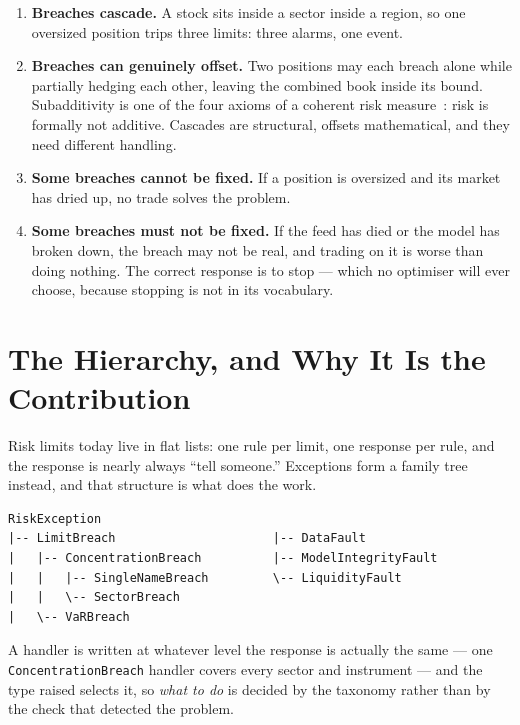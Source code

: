 \documentclass[11pt]{article}
\begin{document}
\begin{enumerate}[leftmargin=*]
\item \textbf{Breaches cascade.} A stock sits inside a sector inside a region, so one
  oversized position trips three limits: three alarms, one event.
\item \textbf{Breaches can genuinely offset.} Two positions may each breach alone while
  partially hedging each other, leaving the combined book inside its bound. Subadditivity is
  one of the four axioms of a coherent risk measure~\cite{artzner1999}: risk is formally not
  additive. Cascades are structural, offsets mathematical, and they need different handling.
\item \textbf{Some breaches cannot be fixed.} If a position is oversized and its market
  has dried up, no trade solves the problem.
\item \textbf{Some breaches must not be fixed.} If the feed has died or the model has
  broken down, the breach may not be real, and trading on it is worse than doing nothing.
  The correct response is to stop --- which no optimiser will ever choose, because stopping
  is not in its vocabulary.
\end{enumerate}

\section{The Hierarchy, and Why It Is the Contribution}

Risk limits today live in flat lists: one rule per limit, one response per rule, and the
response is nearly always ``tell someone.'' Exceptions form a family tree instead, and that
structure is what does the work.

\begin{lstlisting}[basicstyle=\ttfamily\scriptsize]
RiskException
|-- LimitBreach                      |-- DataFault
|   |-- ConcentrationBreach          |-- ModelIntegrityFault
|   |   |-- SingleNameBreach         \-- LiquidityFault
|   |   \-- SectorBreach
|   \-- VaRBreach
\end{lstlisting}

A handler is written at whatever level the response is actually the same --- one
\texttt{ConcentrationBreach} handler covers every sector and instrument --- and the type raised
selects it, so \emph{what to do} is decided by the taxonomy rather than by the check that
detected the problem.
\end{document}
